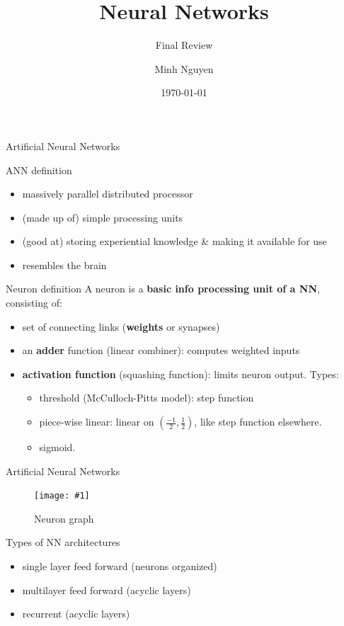 \documentclass[9pt,t]{beamer}
\title{Neural Networks}
\subtitle{Final Review}
\date{\today}
\author{Minh Nguyen}
\newcommand{\picHereWidth}[4] { %
    \begin{figure}[htp] %
        \centering
        \texttt{[image: \#1]} %
        \caption{#2} %
        \label{#3}
    \end{figure} %
}
\begin{document}
\maketitle

\begin{frame}{Artificial Neural Networks}
    \begin{alertblock}{ANN definition}
        \begin{itemize}
            \item massively parallel distributed processor
            \item (made up of) simple processing units
            \item (good at) storing experiential knowledge \& making it available for use
            \item resembles the brain
        \end{itemize}
    \end{alertblock}
    \begin{alertblock}{Neuron definition}
        A neuron is a \textbf{basic info processing unit of a NN}, consisting of:
        \begin{itemize}
            \item set of connecting links (\textbf{weights} or synapses)
            \item an \textbf{adder} function (linear combiner): computes weighted inputs
            \item \textbf{activation function} (squashing function): limits neuron output. Types:
            \begin{itemize}
                \item threshold (McCulloch-Pitts model): step function
                \item piece-wise linear: linear on $(\frac{-1}{2}, \frac{1}{2})$, like step function elsewhere.
                \item sigmoid.
            \end{itemize}
        \end{itemize}
    \end{alertblock}
\end{frame}

\begin{frame}{Artificial Neural Networks}
    \picHereWidth{../images/neuron_graph}{Neuron graph}{fig:neuron}{0.7\linewidth}
    \begin{alertblock}{Types of NN architectures}
        \begin{itemize}
            \item single layer feed forward (neurons organized)
            \item multilayer feed forward (acyclic layers)
            \item recurrent (acyclic layers)
        \end{itemize}
    \end{alertblock}
\end{frame}
\end{document}
